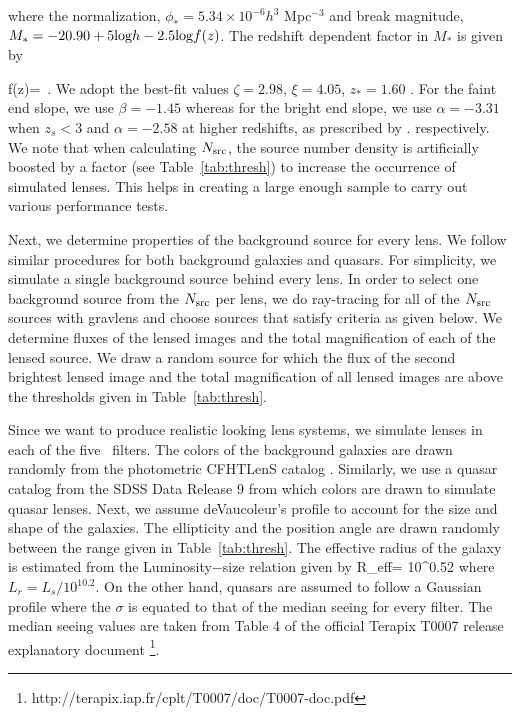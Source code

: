 \documentclass[useAMS,usenatbib,a4paper]{mn2e}
\begin{document}
where the normalization, $\phi_{*}=5.34\times10^{-6} h^3$ Mpc$^{-3}$ and break
magnitude, $M_*=-20.90 + 5 {\rm log} h - 2.5 {\rm log} f(z)$. The redshift
dependent factor in $M_*$ is given by

\be
f(z)= \,.
\ee
We adopt the best-fit values $\zeta=2.98$, $\xi=4.05$, $z_{*}=1.60$
\citep{Oguri2010}. For the faint end slope, we use $\beta=-1.45$ whereas for
the bright end slope, we use $\alpha=-3.31$ when $z_s<3$ and $\alpha=-2.58$ at
higher redshifts, as prescribed by \citep{Oguri2010}. 
respectively. We note that when calculating $N_{\rm src}$, the source
number density is artificially boosted by a factor (see Table~\ref{tab:thresh})
to increase the occurrence of simulated lenses. This helps in creating a large
enough sample to carry out various performance tests.

Next, we determine properties of the background source for every lens. We follow
similar procedures for both background galaxies and quasars. For simplicity, we
simulate a single background source behind every lens. In order to select one
background source from the $N_{\rm src}$ per lens, we do ray-tracing for all of the
$N_{\rm src}$ sources with {\sc gravlens} \citep{Keeton2000} and choose sources that
satisfy criteria as given below. We determine fluxes of the lensed images
and the total magnification of each of the lensed source. We draw a random
source for which the flux of the second brightest lensed image and the total
magnification of all lensed images are above the thresholds given in
Table~\ref{tab:thresh}.

Since we want to produce realistic looking lens systems, we simulate lenses in
each of the five \cfhtls~filters. The colors of the background galaxies are drawn
randomly from the photometric CFHTLenS catalog
\citep{Hildebrandt2012,Erben2013}.  Similarly, we use a quasar catalog from the
SDSS Data Release 9 \citep{Paris2012} from which colors are drawn to simulate
quasar lenses. Next, we assume deVaucoleur's profile to account for the size
and shape of the galaxies. The ellipticity and the position angle are drawn
randomly between the range given in Table~\ref{tab:thresh}. The effective
radius of the galaxy is estimated from the Luminosity$-$size relation
\citep{Bernardi2003} given by 
\be
R_{\rm eff}= 10^{0.52} 
\ee
where $L_r=L_s/10^{10.2}$. On the other hand, quasars are assumed to follow a
Gaussian profile where the $\sigma$ is equated to that of the median seeing for
every filter. The median seeing values are taken from Table 4 of the official
Terapix T0007 release explanatory document \footnote{
    http://terapix.iap.fr/cplt/T0007/doc/T0007-doc.pdf}.  
\end{document}
